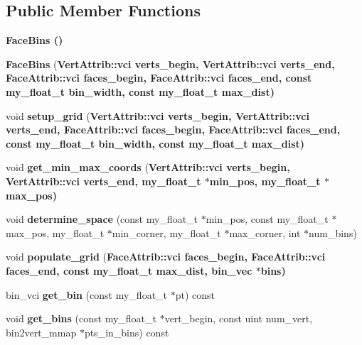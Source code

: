 \subsection*{Public Member Functions}
\begin{CompactItemize}
\item 
\bf{Face\-Bins} ()
\item 
\textbf{Face\-Bins} (\bf{Vert\-Attrib::vci} verts\_\-begin, \bf{Vert\-Attrib::vci} verts\_\-end, \bf{Face\-Attrib::vci} faces\_\-begin, \bf{Face\-Attrib::vci} faces\_\-end, const my\_\-float\_\-t bin\_\-width, const my\_\-float\_\-t max\_\-dist)\label{classSimSite3D_1_1geometry_1_1FaceBins_4c2d64589bee14f2d5e6f8bf95c10ca4}

\item 
void \textbf{setup\_\-grid} (\bf{Vert\-Attrib::vci} verts\_\-begin, \bf{Vert\-Attrib::vci} verts\_\-end, \bf{Face\-Attrib::vci} faces\_\-begin, \bf{Face\-Attrib::vci} faces\_\-end, const my\_\-float\_\-t bin\_\-width, const my\_\-float\_\-t max\_\-dist)\label{classSimSite3D_1_1geometry_1_1FaceBins_d19badcdb6aa99d802205df2449c3ee7}

\item 
void \textbf{get\_\-min\_\-max\_\-coords} (\bf{Vert\-Attrib::vci} verts\_\-begin, \bf{Vert\-Attrib::vci} verts\_\-end, my\_\-float\_\-t $\ast$min\_\-pos, my\_\-float\_\-t $\ast$max\_\-pos)\label{classSimSite3D_1_1geometry_1_1FaceBins_3363105babb3c5ac2014cf56c86c2f37}

\item 
void \textbf{determine\_\-space} (const my\_\-float\_\-t $\ast$min\_\-pos, const my\_\-float\_\-t $\ast$max\_\-pos, my\_\-float\_\-t $\ast$min\_\-corner, my\_\-float\_\-t $\ast$max\_\-corner, int $\ast$num\_\-bins)\label{classSimSite3D_1_1geometry_1_1FaceBins_d00b418f2769fad3b4f2411283818bb0}

\item 
void \textbf{populate\_\-grid} (\bf{Face\-Attrib::vci} faces\_\-begin, \bf{Face\-Attrib::vci} faces\_\-end, const my\_\-float\_\-t max\_\-dist, bin\_\-vec $\ast$bins)\label{classSimSite3D_1_1geometry_1_1FaceBins_af9ff3db3104f3f0c7a8fa05b32f188c}

\item 
bin\_\-vci \textbf{get\_\-bin} (const my\_\-float\_\-t $\ast$pt) const \label{classSimSite3D_1_1geometry_1_1FaceBins_334984c474fa134ceb52b605585784f9}

\item 
void \textbf{get\_\-bins} (const my\_\-float\_\-t $\ast$vert\_\-begin, const uint num\_\-vert, bin2vert\_\-mmap $\ast$pts\_\-in\_\-bins) const \label{classSimSite3D_1_1geometry_1_1FaceBins_d5ea38b17d0b71c1b782f2c1491622d2}


\end{CompactItemize}
